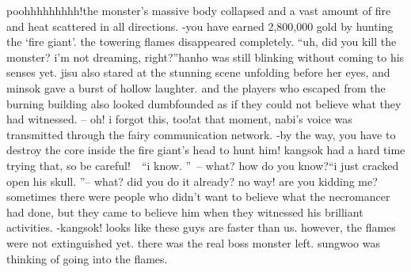 poohhhhhhhhh!the monster’s massive body collapsed and a vast amount of fire and heat scattered in all directions.
-you have earned 2,800,000 gold by hunting the ‘fire giant’.
the towering flames disappeared completely.
“uh, did you kill the monster? i’m not dreaming, right?”hanho was still blinking without coming to his senses yet.
jisu also stared at the stunning scene unfolding before her eyes, and minsok gave a burst of hollow laughter.
 and the players who escaped from the burning building also looked dumbfounded as if they could not believe what they had witnessed.
– oh! i forgot this, too!at that moment, nabi’s voice was transmitted through the fairy communication network.
-by the way, you have to destroy the core inside the fire giant’s head to hunt him! kangsok had a hard time trying that, so be careful!  “i know.
” – what? how do you know?“i just cracked open his skull.
”– what? did you do it already? no way! are you kidding me?sometimes there were people who didn’t want to believe what the necromancer had done, but they came to believe him when they witnessed his brilliant activities.
-kangsok! looks like these guys are faster than us.
however, the flames were not extinguished yet.
 there was the real boss monster left.
sungwoo was thinking of going into the flames.


 